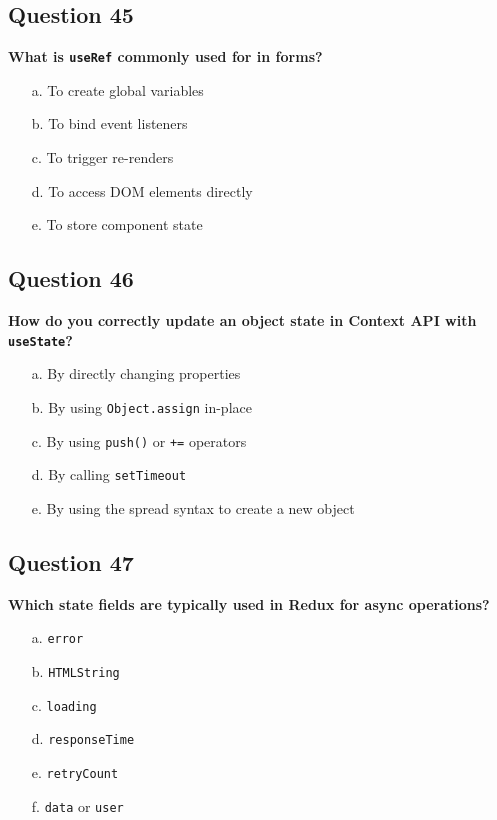 \documentclass{article}
\begin{document}
\subsection*{Question 45}
\textbf{What is \texttt{useRef} commonly used for in forms?}

\begin{itemize}
  \item[a.] To create global variables
  \item[b.] To bind event listeners
  \item[c.] To trigger re-renders
  \item[d.] To access DOM elements directly
  \item[e.] To store component state
\end{itemize}

\subsection*{Question 46}
\textbf{How do you correctly update an object state in Context API with \texttt{useState}?}

\begin{itemize}
  \item[a.] By directly changing properties
  \item[b.] By using \texttt{Object.assign} in-place
  \item[c.] By using \texttt{push()} or \texttt{+=} operators
  \item[d.] By calling \texttt{setTimeout}
  \item[e.] By using the spread syntax to create a new object
\end{itemize}

\subsection*{Question 47}
\textbf{Which state fields are typically used in Redux for async operations?}

\begin{itemize}
  \item[a.] \texttt{error}
  \item[b.] \texttt{HTMLString}
  \item[c.] \texttt{loading}
  \item[d.] \texttt{responseTime}
  \item[e.] \texttt{retryCount}
  \item[f.] \texttt{data} or \texttt{user}
\end{itemize}
\end{document}
